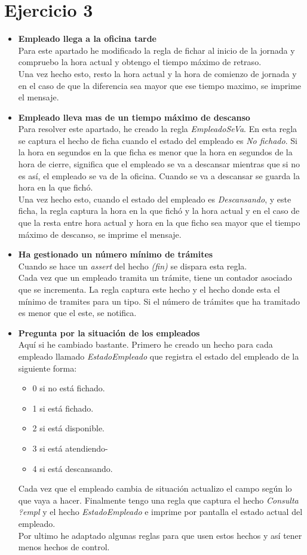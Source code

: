 \documentclass[10pt,spanish]{article}
\begin{document}
	\section{Ejercicio 3}
	\begin{itemize}
		\item \textbf{Empleado llega a la oficina tarde}\\
		Para este apartado he modificado la regla de fichar al inicio de la jornada y compruebo la hora actual y obtengo el tiempo máximo de retraso.\\
		Una vez hecho esto, resto la hora actual y la hora de comienzo de jornada y en el caso de que la diferencia sea mayor que ese tiempo maximo, se imprime el mensaje.
		\item \textbf{Empleado lleva mas de un tiempo máximo de descanso}\\
		Para resolver este apartado, he creado la regla \textit{EmpleadoSeVa}. En esta regla se captura el hecho de ficha cuando el estado del empleado es \textit{No fichado}.
		Si la hora en segundos en la que ficha es menor que la hora en segundos de la hora de cierre, significa que el empleado se va a descansar mientras que si no es así, el empleado se va de la oficina. Cuando se va a descansar se guarda la hora en la que fichó.
		\\Una vez hecho esto, cuando el estado del empleado es \textit{Descansando}, y este ficha, la regla captura la hora en la que fichó y la hora actual y en el caso de que la resta entre hora actual y hora en la que ficho sea mayor que el tiempo máximo de descanso, se imprime el mensaje.
		\item \textbf{Ha gestionado un número mínimo de trámites}\\
		Cuando se hace un \textit{assert} del hecho \textit{(fin)} se dispara esta regla.\\
		Cada vez que un empleado tramita un trámite, tiene un contador asociado que se incrementa.
		La regla captura este hecho y el hecho donde esta el mínimo de tramites para un tipo. Si el número de trámites que ha tramitado es menor que el este, se notifica.
		\item \textbf{Pregunta por la situación de los empleados}\\
		Aquí si he cambiado bastante. Primero he creado un hecho para cada empleado llamado \textit{EstadoEmpleado} que registra el estado del empleado de la siguiente forma:
		\begin{itemize}
			\item 0 si no está fichado.
			\item 1 si está fichado.
			\item 2 si está disponible.
			\item 3 si está atendiendo-
			\item 4 si está descansando.
		\end{itemize}
		Cada vez que el empleado cambia de situación actualizo el campo según lo que vaya a hacer.
		Finalmente tengo una regla que captura el hecho \textit{Consulta ?empl} y el hecho \textit{EstadoEmpleado} e imprime por pantalla el estado actual del empleado. \\
		Por ultimo he adaptado algunas reglas para que usen estos hechos y así tener menos hechos de control.
	\end{itemize}
\end{document}
